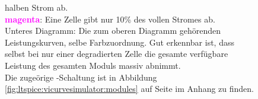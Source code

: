\begin{figure}[h!tb]
{       halben Strom ab.\protect\\
       \textbf{\textcolor{magenta}{magenta}}: Eine  Zelle  gibt nur  10\%  des
       vollen Stromes ab.\protect\\
       Unteres Diagramm: Die zum oberen Diagramm geh\"orenden Leistungskurven,
       selbe  Farbzuordnung. Gut  erkennbar ist,  dass  selbst  bei nur  einer
       degradierten  Zelle  die  gesamte verf\"ugbare  Leistung  des  gesamten
       Moduls massiv abnimmt.\protect\\
       Die       zuge\"orige       -Schaltung       ist       in
       Abbildung    \ref{fig:ltspice:vicurvesimulator:modules}    auf    Seite
       \pageref{fig:ltspice:vicurvesimulator:modules} im Anhang zu finden.%
   }
   \label{fig:ivcurve:cells}
\end{figure}

